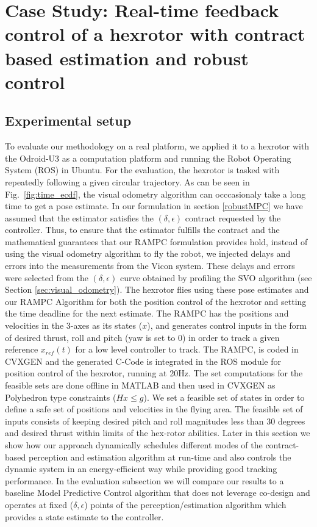 \section{Case Study: Real-time feedback control of a hexrotor with contract based estimation and robust control}
\label{sec:experiments}

\subsection{Experimental setup}
To evaluate our methodology on a real platform, we applied it to a hexrotor with the Odroid-U3 as a computation platform and running the Robot Operating System (ROS) in Ubuntu. For the evaluation, the hexrotor is tasked with repeatedly following a given circular trajectory.
As can be seen in Fig.~\ref{fig:time_ecdf}, the visual odometry algorithm can occcasionaly take a long time to get a pose estimate. In our formulation in section \ref{robustMPC} we have assumed that the estimator satisfies the $(\delta, \epsilon)$ contract requested by the controller. Thus, to ensure that the estimator fulfills the contract and the mathematical guarantees that our RAMPC formulation provides hold, instead of using the visual odometry algorithm to fly the robot, we injected delays and errors into the measurements from the Vicon system. These delays and errors were selected from the $(\delta,\epsilon)$ curve obtained by profiling the SVO algorithm (see Section \ref{sec:visual_odometry}).
The hexrotor flies using these pose estimates and our RAMPC Algorithm for both the position control of the hexrotor and setting the time deadline for the next estimate. The RAMPC has the positions and velocities in the 3-axes as its states ($x$), and generates control inputs in the form of desired thrust, roll and pitch (yaw is set to 0) in order to track a given reference $x_{ref}(t)$ for a low level controller to track. The RAMPC, is coded in CVXGEN \cite{cvxgen} and the generated C-Code is integrated in the ROS module for position control of the hexrotor, running at 20Hz. The set computations for the feasible sets are done offline in MATLAB and then used in CVXGEN as Polyhedron type constraints ($Hx \le g$). We set a feasible set of states in order to define a safe set of positions and velocities in the flying area. The feasible set of inputs consists of keeping desired pitch and roll magnitudes less than $30$ degrees and desired thrust within limits of the hex-rotor abilities.
Later in this section we show how our approach dynamically schedules different modes of the contract-based perception and estimation algorithm at run-time and also controls the dynamic system in an energy-efficient way while providing good tracking performance. In the evaluation subsection we will compare our results to a baseline Model Predictive Control algorithm that does not leverage co-design and operates at fixed ($\delta,\epsilon$) points of the perception/estimation algorithm which provides a state estimate to the controller.

